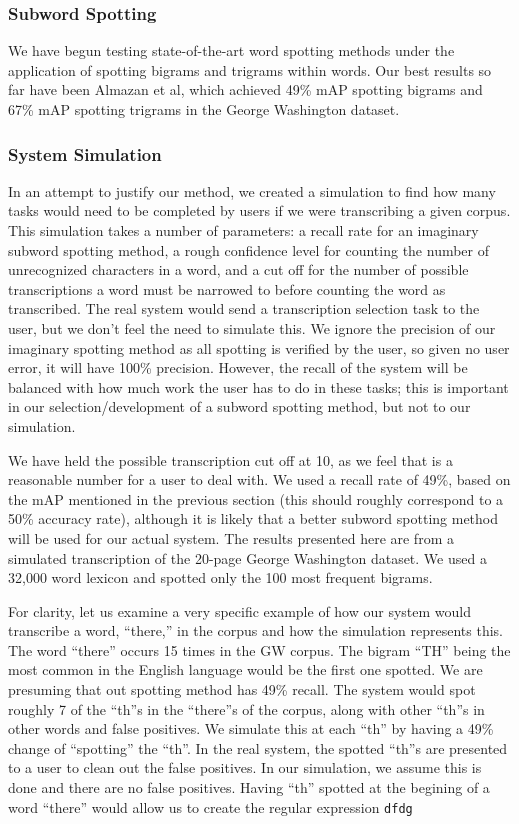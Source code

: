 \documentclass[ms]{byuprop}
\begin{document}
\subsubsection{Subword Spotting}
We have begun testing state-of-the-art word spotting methods under the application of spotting bigrams and trigrams within words. Our best results so far have been Almazan et al\cite{Almazan2014}, which achieved 49\% mAP spotting bigrams and 67\% mAP spotting trigrams in the George Washington dataset.

\subsubsection{System Simulation}
In an attempt to justify our method, we created a simulation to find how many tasks would need to be completed by users if we were transcribing a given corpus. This simulation takes a number of parameters: a recall rate for an imaginary subword spotting method, a rough confidence level for counting the number of unrecognized characters in a word, and a cut off for the number of possible transcriptions a word must be narrowed to before counting the word as transcribed. The real system would send a transcription selection task to the user, but we don't feel the need to simulate this. We ignore the precision of our imaginary spotting method as all spotting is verified by the user, so given no user error, it will have 100\% precision. However, the recall of the system will be balanced with how much work the user has to do in these tasks; this is important in our selection/development of a subword spotting method, but not to our simulation.

We have held the possible transcription cut off at 10, as we feel that is a reasonable number for a user to deal with. We used a recall rate of 49\%, based on the mAP mentioned in the previous section (this should roughly correspond to a 50\% accuracy rate), although it is likely that a better subword spotting method will be used for our actual system. The results presented here are from a simulated transcription of the 20-page George Washington dataset. We used a 32,000 word lexicon and spotted only the 100 most frequent bigrams.

For clarity, let us examine a very specific example of how our system would transcribe a word, ``there,'' in the corpus and how the simulation represents this. The word ``there'' occurs 15 times in the GW corpus. The bigram ``TH'' being the most common in the English language would be the first one spotted. We are presuming that out spotting method has 49\% recall. The system would spot roughly 7 of the ``th''s in the ``there''s of the corpus, along with other ``th''s in other words and false positives. We simulate this at each ``th'' by having a 49\% change of ``spotting'' the ``th''. In the real system, the spotted ``th''s are presented to a user to clean out the false positives. In our simulation, we assume this is done and there are no false positives. Having ``th'' spotted at the begining of a word ``there'' would allow us to create the regular expression \lstinline|dfdg|
\end{document}
